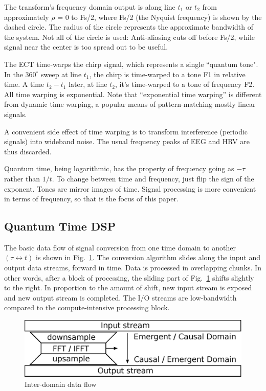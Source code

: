 The transform's frequency domain output is along line $t_1$ or $t_2$ from
approximately $\rho$ = 0 to Fs/2, where Fs/2 (the Nyquist frequency)
is shown by the dashed circle.
The radius of the circle represents the approximate bandwidth of the system.
Not all of the circle is used: Anti-aliasing cuts off before Fs/2, while signal
near the center is too spread out to be useful.

The ECT time-warps the chirp signal, which represents a single ``quantum tone".
In the $360^{\circ}$ sweep at line $t_1$,
the chirp is time-warped to a tone F1 in relative time.
A time $t_2-t_1$ later, at line $t_2$,
it's time-warped to a tone of frequency F2.
All time warping is exponential.
Note that ``exponential time warping'' is different from dynamic time warping,
a popular means of pattern-matching mostly linear signals.

A convenient side effect of time warping is to transform interference
(periodic signals) into wideband noise.
The usual frequency peaks of EEG and HRV are thus discarded.

Quantum time, being logarithmic, has the property of frequency going as
$-\tau$ rather than $1/t$.
To change between time and frequency, just flip the sign of the exponent.
Tones are mirror images of time.
Signal processing is more convenient in terms of frequency,
so that is the focus of this paper.

\subsection{\label{sec:level1}Quantum Time DSP}

The basic data flow of signal conversion from one time domain to another
$(\tau \leftrightarrow t)$ is shown in Fig.~\ref{fig:sled}.
The conversion algorithm slides along the input and output data streams,
forward in time.
Data is processed in overlapping chunks.
In other words, after a block of processing,
the sliding part of Fig.~\ref{fig:sled} shifts slightly to the right.
In proportion to the amount of shift,
new input stream is exposed and new output stream is completed.
The I/O streams are low-bandwidth compared to the compute-intensive
processing block.

\begin{figure}
	\centering
	\includegraphics[width=0.95\linewidth]{../source/sled_e}
	\caption[Quantum to Relative Time Translation Flow]{Inter-domain data flow}
	\label{fig:sled}
\end{figure}

